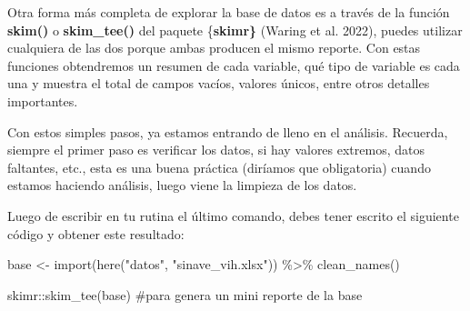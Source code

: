 \documentclass[
  letterpaper,
  DIV=11,
  numbers=noendperiod]{scrreprt}
\newenvironment{Shaded}{\begin{snugshade}}{\end{snugshade}}
\newcommand{\CommentTok}[1]{\textcolor[rgb]{0.37,0.37,0.37}{#1}}
\newcommand{\FunctionTok}[1]{\textcolor[rgb]{0.28,0.35,0.67}{#1}}
\newcommand{\NormalTok}[1]{\textcolor[rgb]{0.00,0.23,0.31}{#1}}
\newcommand{\OtherTok}[1]{\textcolor[rgb]{0.00,0.23,0.31}{#1}}
\newcommand{\SpecialCharTok}[1]{\textcolor[rgb]{0.37,0.37,0.37}{#1}}
\newcommand{\StringTok}[1]{\textcolor[rgb]{0.13,0.47,0.30}{#1}}
\begin{document}
Otra forma más completa de explorar la base de datos es a través de la
función \textbf{skim()} o \textbf{skim\_tee()} del paquete
\{\textbf{skimr\}} (Waring et al. 2022), puedes utilizar cualquiera de
las dos porque ambas producen el mismo reporte. Con estas funciones
obtendremos un resumen de cada variable, qué tipo de variable es cada
una y muestra el total de campos vacíos, valores únicos, entre otros
detalles importantes.

Con estos simples pasos, ya estamos entrando de lleno en el análisis.
Recuerda, siempre el primer paso es verificar los datos, si hay valores
extremos, datos faltantes, etc., esta es una buena práctica (diríamos
que obligatoria) cuando estamos haciendo análisis, luego viene la
limpieza de los datos.

Luego de escribir en tu rutina el último comando, debes tener escrito el
siguiente código y obtener este resultado:

\begin{Shaded}
\begin{Highlighting}[]
\NormalTok{base }\OtherTok{\textless{}{-}} \FunctionTok{import}\NormalTok{(}\FunctionTok{here}\NormalTok{(}\StringTok{"datos"}\NormalTok{, }\StringTok{"sinave\_vih.xlsx"}\NormalTok{)) }\SpecialCharTok{\%\textgreater{}\%} 
  \FunctionTok{clean\_names}\NormalTok{()}

\NormalTok{skimr}\SpecialCharTok{::}\FunctionTok{skim\_tee}\NormalTok{(base) }\CommentTok{\#para genera un mini reporte de la base}
\end{Highlighting}
\end{Shaded}
\end{document}
